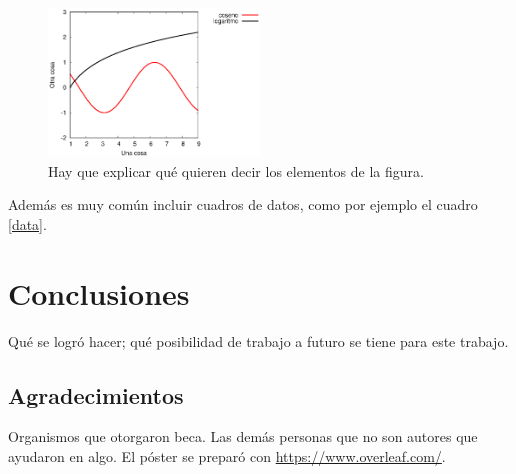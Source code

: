 \documentclass[a1]{sciposter} %
\begin{document}
\begin{multicols}{2}
\begin{figure}
\setcounter{figure}{1} %
\captionsetup{type=figure} %
\begin{center}
   \includegraphics[width=0.5\textwidth]{curvas.eps}
   \end{center}
    \caption{Hay que explicar qué quieren decir los elementos de la figura.}
    \label{curvas}
\end{figure}

Además es muy común incluir cuadros de datos, como por ejemplo el
cuadro \ref{data}.

\begin{table}
\setcounter{table}{0} %
\captionsetup{type=table} %
\caption{Aquí explicas cómo interpreta el cuadro.}
\label{data}
\begin{center}
\end{center}
\end{table}

\section{Conclusiones}

Qué se logró hacer; qué posibilidad de trabajo a futuro se tiene para
este trabajo.

\subsection*{Agradecimientos}

Organismos que otorgaron beca. Las demás personas que no son autores
que ayudaron en algo. El póster se preparó con
\url{https://www.overleaf.com/}.

\end{multicols}



\end{document}

